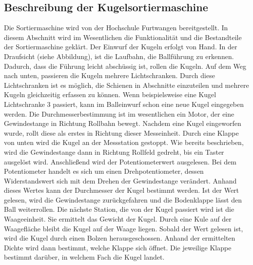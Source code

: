 \subsection{Beschreibung der Kugelsortiermaschine}
Die Sortiermaschine wird von der Hochschule Furtwangen bereitgestellt. In diesem Abschnitt wird im Wesentlichen die Funktionalität und die Bestandteile der Sortiermaschine geklärt.
Der Einwurf der Kugeln erfolgt von Hand. In der Draufsicht (siehe Abbildung), ist die Laufbahn, die Ballführung zu erkennen. Dadurch, dass die Führung leicht abschüssig ist, rollen die Kugeln. Auf dem Weg nach unten, passieren die Kugeln mehrere Lichtschranken. Durch diese Lichtschranken ist es möglich, die Schienen in Abschnitte einzuteilen und mehrere Kugeln gleichzeitig erfassen zu können. Wenn beispielsweise eine Kugel Lichtschranke 3 passiert, kann im Balleinwurf schon eine neue Kugel eingegeben werden. Die Durchmesserbestimmung ist im wesentlichen ein Motor, der eine Gewindestange in Richtung Rollbahn bewegt. Nachdem eine Kugel eingeworfen wurde, rollt diese als erstes in Richtung dieser Messeinheit. Durch eine Klappe von unten wird die Kugel an der Messstation gestoppt. Wie bereits beschrieben, wird die Gewindestange dann in Richtung Rollfeld gedreht, bis ein Taster ausgelöst wird. Anschließend wird der Potentiometerwert ausgelesen. Bei dem Potentiometer handelt es sich um einen Drehpotentiometer, dessen Widerstandswert sich mit dem Drehen der Gewindestange verändert. Anhand dieses Wertes kann der Durchmesser der Kugel bestimmt werden. Ist der Wert gelesen, wird die Gewindestange zurückgefahren und die Bodenklappe lässt den Ball weiterrollen. Die nächste Station, die von der Kugel passiert wird ist die Waageeinheit. Sie ermittelt das Gewicht der Kugel. Durch eine Kule auf der Waagefläche bleibt die Kugel auf der Waage liegen. Sobald der Wert gelesen ist, wird die Kugel durch einen Bolzen herausgeschossen. Anhand der ermittelten Dichte wird dann bestimmt, welche Klappe sich öffnet. Die jeweilige Klappe bestimmt darüber, in welchem Fach die Kugel landet.
